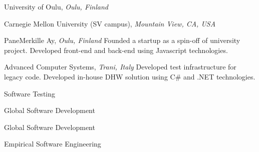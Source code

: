 \documentclass[9pt]{article}
\begin{document}
\noindent University of Oulu, \emph{Oulu, Finland} \vspace{0.01in} 
\newline{}
\bigskip

\noindent Carnegie Mellon University (SV campus), \emph{Mountain View, CA, USA} \vspace{0.01in}  
\newline{}
\bigskip

\noindent PaneMerkille Ay, \emph{Oulu, Finland} \vspace{0.01in} 
\newline{}
\newline\noindent Founded a startup as a spin-off of university project.
\newline\noindent Developed front-end and back-end using Javascript technologies.
\bigskip

\noindent Advanced Computer Systems, \emph{Trani, Italy} \vspace{0.01in} 
\newline{}
\newline\noindent Developed test infrastructure for legacy code.
\newline\noindent Developed in-house DHW solution using C\# and .NET technologies.
\bigskip

\newpage
{}
  
\newline\noindent Software Testing
\bigskip

  
\newline\noindent Global Software Development 
\bigskip

  
\newline\noindent Global Software Development 
\bigskip

  
\newline\noindent Empirical Software Engineering 
\bigskip
\end{document}
